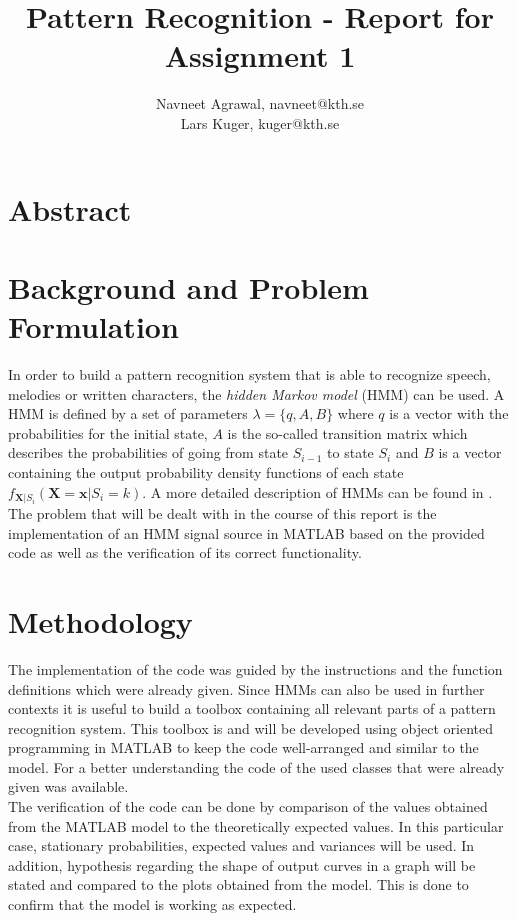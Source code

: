 \documentclass[twocolumn, 10pt]{IEEEtran}
\begin{document}
\title{Pattern Recognition - Report for Assignment 1}
\author{Navneet Agrawal, navneet@kth.se \\ Lars Kuger, kuger@kth.se}

\maketitle

\section{Abstract}


\section{Background and Problem Formulation}
\label{background}
In order to build a pattern recognition system that is able to recognize speech, melodies or written characters, the \emph{hidden Markov model} (HMM) can be used. A HMM is defined by a set of parameters $\lambda = \{q,A,B\}$ where $q$ is a vector with the probabilities for the initial state, $A$ is the so-called transition matrix which describes the probabilities of going from state $S_{i-1}$ to state $S_{i}$ and $B$ is a vector containing the output probability density functions of each state $f_{\mathbf{X}|S_i}(\mathbf{X}=\mathbf{x}| S_i = k)$. A more detailed description of HMMs can be found in \cite{CourseBook}. The problem that will be dealt with in the course of this report is the implementation of an HMM signal source in \textsc{MATLAB} based on the provided code as well as the verification of its correct functionality.

\section{Methodology}
\label{methodology}
The implementation of the code was guided by the instructions and the function definitions which were already given. Since HMMs can also be used in further contexts it is useful to build a toolbox containing all relevant parts of a pattern recognition system. This toolbox is and will be developed using object oriented programming in \textsc{MATLAB} to keep the code well-arranged and similar to the model. For a better understanding the code of the used classes that were already given was available. \\
The verification of the code can be done by comparison of the values obtained from the \textsc{MATLAB} model to the theoretically expected values. In this particular case, stationary probabilities, expected values and variances will be used. In addition, hypothesis regarding the shape of output curves in a graph will be stated and compared to the plots obtained from the model. This is done to confirm that the model is working as expected.
\end{document}

